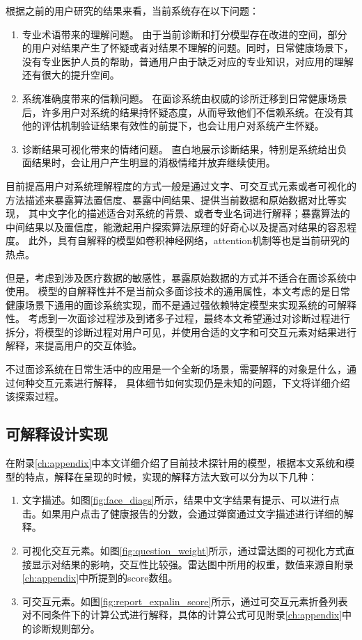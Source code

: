 根据之前的用户研究的结果来看，当前系统存在以下问题：
\begin{enumerate}
    \item 专业术语带来的理解问题。
    由于当前诊断和打分模型存在改进的空间，部分的用户对结果产生了怀疑或者对结果不理解的问题。同时，日常健康场景下，没有专业医护人员的帮助，普通用户由于缺乏对应的专业知识，对应用的理解还有很大的提升空间。
    \item 系统准确度带来的信赖问题。
    在面诊系统由权威的诊所迁移到日常健康场景后，许多用户对系统的结果持怀疑态度，从而导致他们不信赖系统。在没有其他的评估机制验证结果有效性的前提下，也会让用户对系统产生怀疑。
    \item 诊断结果可视化带来的情绪问题。
    直白地展示诊断结果，特别是系统给出负面结果时，会让用户产生明显的消极情绪并放弃继续使用。
\end{enumerate}


目前提高用户对系统理解程度的方式一般是通过文字、可交互式元素或者可视化的方法描述来暴露算法置信度、暴露中间结果、提供当前数据和原始数据对比等实现\cite{wang2019designing, kocielnik2019will}，
其中文字化的描述适合对系统的背景、或者专业名词进行解释；暴露算法的中间结果以及置信度，能激起用户探索算法原理的好奇心以及提高对结果的容忍程度。
此外，具有自解释的模型如卷积神经网络，attention机制等也是当前研究的热点。

但是，考虑到涉及医疗数据的敏感性，暴露原始数据的方式并不适合在面诊系统中使用。
模型的自解释性并不是当前众多面诊技术的通用属性，本文考虑的是日常健康场景下通用的面诊系统实现，而不是通过强依赖特定模型来实现系统的可解释性。
考虑到一次面诊过程涉及到诸多子过程，最终本文希望通过对诊断过程进行拆分，将模型的诊断过程对用户可见，并使用合适的文字和可交互元素对结果进行解释，来提高用户的交互体验。


不过面诊系统在日常生活中的应用是一个全新的场景，需要解释的对象是什么，通过何种交互元素进行解释，
具体细节如何实现仍是未知的问题，下文将详细介绍该探索过程。


\subsection{可解释设计实现}

在附录\ref{ch:appendix}中本文详细介绍了目前技术探针用的模型，根据本文系统和模型的特点，解释在呈现的时候，实现的解释方法大致可以分为以下几种：
\begin{enumerate}
    \item 文字描述。如图\ref{fig:face_diags}所示，结果中文字结果有提示、可以进行点击。如果用户点击了健康报告的分数，会通过弹窗通过文字描述进行详细的解释。

    \item 可视化交互元素。如图\ref{fig:question_weight}所示，通过雷达图的可视化方式直接显示对结果的影响，交互性比较强。雷达图中所用的权重，数值来源自附录\ref{ch:appendix}中所提到的score数组。
    
    \item 可交互元素。如图\ref{fig:report_expalin_score}所示，通过可交互元素折叠列表对不同条件下的计算公式进行解释，具体的计算公式可见附录\ref{ch:appendix}中的诊断规则部分。
\end{enumerate}

